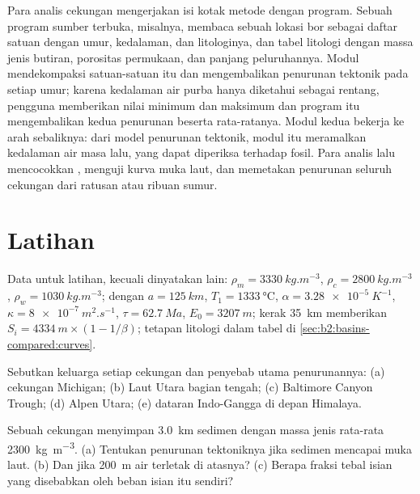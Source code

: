 \begin{inthelab}
Para analis cekungan mengerjakan isi kotak metode dengan program. Sebuah program sumber terbuka, misalnya,
membaca sebuah lokasi bor sebagai daftar satuan dengan umur, kedalaman, dan litologinya, dan
tabel litologi dengan massa jenis butiran, porositas permukaan, dan panjang peluruhannya. Modul
 mendekompaksi satuan-satuan itu dan mengembalikan penurunan tektonik pada setiap umur;
karena kedalaman air purba hanya diketahui sebagai rentang, pengguna memberikan nilai minimum dan maksimum dan
program itu mengembalikan kedua penurunan beserta rata-ratanya. Modul kedua bekerja ke arah sebaliknya:
dari model penurunan tektonik, modul itu meramalkan kedalaman air masa lalu, yang dapat
diperiksa terhadap fosil. Para analis lalu mencocokkan , menguji kurva muka laut, dan
memetakan penurunan seluruh cekungan dari ratusan atau ribuan sumur.
\end{inthelab}

\section*{Latihan}\label{sec:b2:basins-compared:exercises}

Data untuk latihan, kecuali dinyatakan lain: $\rho_m = \qty{3330}{kg.m^{-3}}$, $\rho_c =
\qty{2800}{kg.m^{-3}}$, $\rho_w = \qty{1030}{kg.m^{-3}}$;  dengan $a =
\qty{125}{km}$, $T_1 = \qty{1333}{\celsius}$, $\alpha = \qty{3.28e-5}{K^{-1}}$, $\kappa =
\qty{8e-7}{m^2.s^{-1}}$, $\tau = \qty{62.7}{Ma}$, $E_0 = \qty{3207}{m}$; kerak \qty{35}{km}
memberikan $S_i = \qty{4334}{m}\times(1 - 1/\beta)$; tetapan litologi dalam tabel di
\cref{sec:b2:basins-compared:curves}.

\begin{exercise}[$\star$]\label{exo:b2:basins-compared:1}
Sebutkan keluarga setiap cekungan dan penyebab utama penurunannya: (a) cekungan Michigan;
(b) Laut Utara bagian tengah; (c) Baltimore Canyon Trough; (d)  Alpen Utara;
(e) dataran Indo-Gangga di depan Himalaya.
\end{exercise}

\begin{exercise}[$\star$]\label{exo:b2:basins-compared:2}
Sebuah cekungan menyimpan \qty{3.0}{km} sedimen dengan massa jenis rata-rata \qty{2300}{kg.m^{-3}}. (a) Tentukan
penurunan tektoniknya jika sedimen mencapai muka laut. (b) Dan jika \qty{200}{m} air terletak di
atasnya? (c) Berapa fraksi tebal isian yang disebabkan oleh beban isian itu sendiri?
\end{exercise}

